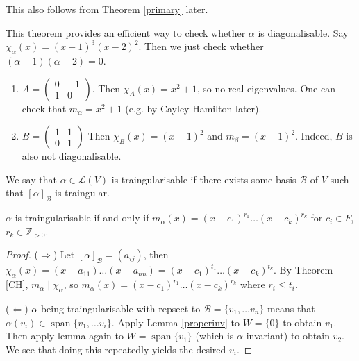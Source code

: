 \documentclass{scrartcl}
\def\le{\leqslant}
\def\Z{\mathbb{Z}}
\def\L{\mathcal{L}}
\def\B{\mathcal{B}}
\DeclareMathOperator{\id}{Id}
\DeclareMathOperator{\spn}{span}  %
\begin{document}
\begin{remark}
	This also follows from Theorem \ref{primary} later.
\end{remark}
\iffalse
Another proof? Let $m_\alpha(x) = (x-\lambda_1)\dots(x-\lambda_k)$, where $\lambda_i$ are distinct. We want to show that $V = \bigoplus E_{\lambda_i}$. It suffices to show $V = \sum E_{\lambda_i}$, i.e. to exhibit $v = v_1+\dots+v_k$ with $v_i \in E_{\lambda_i}=\ker(\alpha-\lambda_i\id)$. This would hold if there exists $h_1, \dots h_k \in F[x]$ such that $1 = h_1(x)+\dots+h_k(x)$ and $(x-\lambda_i)h_i(x)$ is divisible by $m_\alpha(x)$. Because, the above would show that $\id = h_1(\alpha)+\dots+h_k(\alpha) \implies v = h_1(\alpha)v+\dots+h_k(\alpha)v$ and $(\alpha-\lambda_i)h_i(\alpha)v = 0$. Now we check the claim. Let $f_i(x) = \frac{m_\alpha(x)}{x-\lambda_i}$. Then $\gcd(h_1, \dots h_k) = 1$, so by Bezout, $\sum f_i(x)g_i(x) = 1$. Then taking $h_i(x) = f_i(x)g_i(x)$ finishes the proof. 
\fi
This theorem provides an efficient way to check whether $\alpha$ is diagonalisable. Say $\chi_\alpha(x) = (x-1)^3(x-2)^2$. Then we just check whether $(\alpha-1)(\alpha-2) = 0$.
\begin{example}
	\begin{enumerate}
		\item $A = \begin{pmatrix}
			0 & -1 \\
			1 & 0
		\end{pmatrix}$. Then $\chi_A(x) = x^2+1$, so no real eigenvalues. One can check that $m_\alpha = x^2+1$ (e.g. by Cayley-Hamilton later).
		\item $B = \begin{pmatrix}
			1 & 1 \\
			0 & 1
		\end{pmatrix}$ Then $\chi_B(x) = (x-1)^2$ and $m_\beta=(x-1)^2$. Indeed, $B$ is also not diagonalisable.
	\end{enumerate}
\end{example}
\begin{definition}
	We say that $\alpha \in \L(V)$ is traingularisable if there exists some basis $\B$ of $V$ such that $[\alpha]_\B$ is traingular. 
\end{definition}
\begin{theorem}
	$\alpha$ is traingularisable if and only if $m_\alpha(x) = (x-c_1)^{r_1}\dots (x-c_k)^{r_k}$ for $c_i \in F$, $r_k \in \Z_{>0}$.
\end{theorem}
\begin{proof}
	($\Rightarrow$) Let $[\alpha]_\B = (a_{ij})$, then $\chi_\alpha(x) = (x-a_{11})\dots(x-a_{nn}) = (x-c_1)^{t_1}\dots (x-c_k)^{t_k}$. By Theorem \ref{CH}, $m_\alpha \mid \chi_\alpha$, so $m_\alpha(x) = (x-c_1)^{r_1}\dots (x-c_k)^{r_k}$ where $r_i \le t_i$.
\par ($\Leftarrow$) $\alpha$ being traingularisable with repsect to $\B = \{v_1, \dots v_n\}$ means that $\alpha(v_i) \in \spn\{v_1, \dots v_i\}$. Apply Lemma \ref{properinv} to $W = \{0\}$ to obtain $v_1$. Then apply lemma again to $W = \spn\{v_1\}$ (which is $\alpha$-invariant) to obtain $v_2$. We see that doing this repeatedly yields the desired $v_i$. 
\end{proof}
\end{document}

